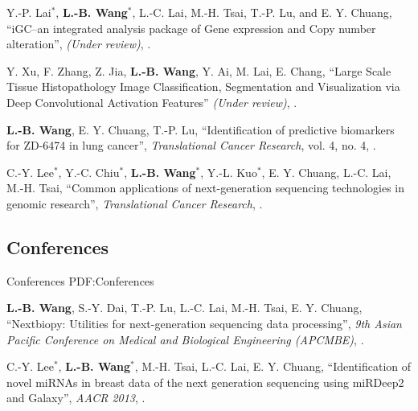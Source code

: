 \documentclass[a4paper,10pt,oneside]{article}
\begin{document}
\begin{body}
\begin{publication}[series=pub, widest*=100]
    \item Y.-P. Lai$^*$, \textbf{L.-B. Wang}$^*$, L.-C. Lai, M.-H. Tsai, T.-P. Lu, and E. Y. Chuang,
        ``iGC–an integrated analysis package of Gene expression and Copy number alteration'',
        \textit{(Under review)},
        .

    \item
        Y. Xu, F. Zhang, Z. Jia, \textbf{L.-B. Wang}, Y. Ai, M. Lai, E. Chang,
        ``Large Scale Tissue Histopathology Image Classification, Segmentation and Visualization via Deep Convolutional Activation Features''
        \textit{(Under review)},
        .

    \item
        \textbf{L.-B. Wang}, E. Y. Chuang, T.-P. Lu,
        ``Identification of predictive biomarkers for ZD-6474 in lung cancer'',
        \textit{Translational Cancer Research}, vol. 4, no. 4,
        .

    \item
        C.-Y. Lee$^*$, Y.-C. Chiu$^*$, \textbf{L.-B. Wang}$^*$, Y.-L. Kuo$^*$, E. Y. Chuang, L.-C. Lai, M.-H. Tsai,
        ``Common applications of next-generation sequencing technologies in genomic research'',
        \textit{Translational Cancer Research},
        .

\end{publication}
\BigEntryGap

\subsection
{Conferences}
{Conferences}
{PDF:Conferences}

\begin{publication}[widest*=100]  %

    \item
        \textbf{L.-B. Wang}, S.-Y. Dai, T.-P. Lu, L.-C. Lai, M.-H. Tsai, E. Y. Chuang,
        ``Nextbiopy: Utilities for next-generation sequencing data processing'',
        \textit{9th Asian Pacific Conference on Medical and Biological Engineering (APCMBE)},
        .

    \item
        C.-Y. Lee$^*$, \textbf{L.-B. Wang}$^*$, M.-H. Tsai, L.-C. Lai, E. Y. Chuang,
        ``Identification of novel miRNAs in breast data of the next generation sequencing using miRDeep2 and Galaxy'',
        \textit{AACR 2013},
        .


\end{publication}
\end{body}
\end{document}
